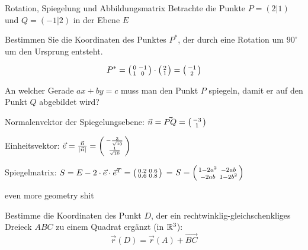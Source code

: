 \begin{example2}{Rotation{,} Spiegelung und Abbildungsmatrix}
    Betrachte die Punkte $P = (2|1)$ und $Q = (-1|2)$ in der Ebene $E$

    \vspace{3mm}

    Bestimmen Sie die Koordinaten des Punktes $P^{*}$, der durch eine Rotation um $90^{\circ}$ um den Ursprung entsteht.

    $$
    P^{*} = \begin{psmallmatrix}
        0 & -1 \\
        1 & 0
    \end{psmallmatrix} \cdot \begin{psmallmatrix}
        2 \\
        1
    \end{psmallmatrix} = \begin{psmallmatrix}
        -1 \\
        2
    \end{psmallmatrix}
    $$
    
    \vspace{3mm}

    An welcher Gerade $ax + by = c$ muss man den Punkt $P$ spiegeln, damit er auf den Punkt $Q$ abgebildet wird?

    Normalenvektor der Spiegelungsebene: $\vec{n} = \vec{PQ} = \begin{psmallmatrix}
        -3 \\
        1
    \end{psmallmatrix}$

    Einheitsvektor: $\vec{e} = \frac{\vec{n}}{|\vec{n}|} = \begin{psmallmatrix}
        -\frac{3}{\sqrt{10}} \\
        \frac{1}{\sqrt{10}}
    \end{psmallmatrix}$

    Spiegelmatrix: $S = E - 2 \cdot \vec{e} \cdot \vec{e}^{T} = \begin{psmallmatrix}
        0.2 & 0.6 \\
        0.6 & 0.8
    \end{psmallmatrix}$ = $S = \begin{psmallmatrix}
        1 - 2a^2 & -2ab \\
        -2ab & 1 - 2b^2
    \end{psmallmatrix}$
\end{example2}

\begin{example2}{even more geometry shit}

    Bestimme die Koordinaten des Punkt $D$, der ein rechtwinklig-gleichschenkliges Dreieck $ABC$ zu einem Quadrat ergänzt (in $\mathbb{R}^3$):
    $$\vec{r}(D) = \vec{r}(A) + \vec{BC}$$
    
\end{example2}